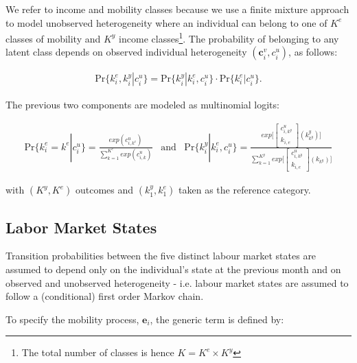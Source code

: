 \documentclass[12pt, a4paper]{article}
\begin{document}
We refer to income and mobility classes because we use a finite mixture approach to
model unobserved heterogeneity where an individual can belong to one of $K^{e}$ classes of mobility and $K^y$ income classes\footnote{The total number of classes is hence $K=K^{e}\times K^{y}$}. The probability of belonging to any latent class depends on observed individual heterogeneity $(\textbf{c}_i^v,c_i^u)$, as follows:

\begin{align}\label{eq:prob_unobs_het}
\text{Pr}\{k_i^e,k_i^y|c_i^u\}=\text{Pr}\{k_i^y|k_i^e,c_i^u\}\cdot\text{Pr}\{k_i^e|c_i^u\}.
\end{align}

The previous two components are modeled as multinomial logits:

\begin{align}\label{eq:prob_unobs_het_multin}
\text{Pr}\{k_i^e=k^e|c_i^u\}=\frac{exp(c_{i,k^e}^{u})}{\sum\limits_{k=1}^{K^e}exp(c_{i,k}^{u})} \,\,\,\,\, \text{and} \,\,\,\,\, \text{Pr}\{k_i^y|k_i^e,c_i^u\}=\frac{exp\Big[\begin{bmatrix}
           c_{i,k^y}^{u} \\
           k_{i,e}
         \end{bmatrix}(k_{k^y}^y)\Big]}{\sum\limits_{k=1}^{K^y}exp\Big[\begin{bmatrix}
           c_{i,k^y}^{u} \\
           k_{i,e}
         \end{bmatrix}(k_{k^y})\Big]}
\end{align}

with $(K^y,K^e)$ outcomes and $(k^y_1,k^e_1)$ taken as the reference category.  

\subsection{Labor Market States}\label{sec:lab_market_states}

Transition probabilities between the five distinct labour market states are assumed to depend only on the individual's state at the previous month and on observed and unobserved heterogeneity - i.e. labour market states are assumed to follow a (conditional) first order Markov chain.

To specify the mobility process, $\textbf{e}_i$, the generic term is defined by:
\end{document}

